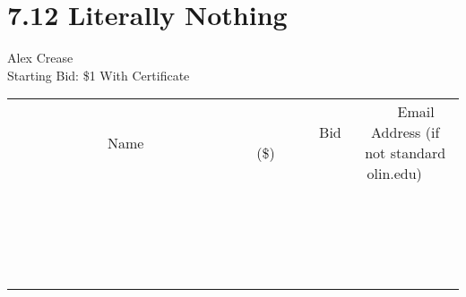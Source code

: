 \documentclass[11pt]{article}
\begin{document}
\section*{7.12 Literally Nothing}
Alex Crease
\\
Starting Bid: \$1
\newline
With Certificate
\\[3ex]
\begin{tabular}{c c c}
~~~~~~~~~~~~~Name~~~~~~~~~~~~~ & ~~~~~~~~~Bid (\$)~~~~~~~~~  & ~~~Email Address (if not standard olin.edu)~~~\\
 & & \\
\hline
 & & \\
\hline
 & & \\
\hline
 & & \\
\hline
 & & \\
\hline
 & & \\
\hline
 & & \\
\hline
 & & \\
\hline
 & & \\
\hline
 & & \\
\hline
 & & \\
\hline
 & & \\
\hline
 & & \\
\hline
 & & \\
\hline
 & & \\
\hline
 & & \\
\hline
 & & \\
\hline
 & & \\
\hline
 & & \\
\hline
\end{tabular}
\newpage
\end{document}
